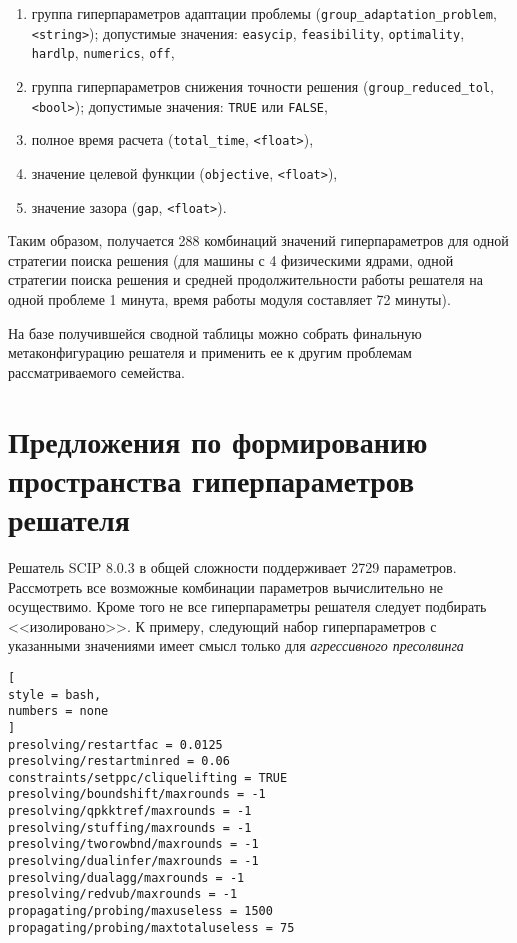 \documentclass[%
	11pt,
	a4paper,
	utf8,
		]{article}
\begin{document}
\begin{enumerate}
	\item группа гиперпараметров адаптации проблемы (\verb|group_adaptation_problem|, \verb|<string>|); допустимые значения: \verb|easycip|, \verb|feasibility|, \verb|optimality|, \verb|hardlp|, \verb|numerics|, \verb|off|,
	
	\item группа гиперпараметров снижения точности решения (\verb|group_reduced_tol|, \verb|<bool>|); допустимые значения: \verb|TRUE| или \verb|FALSE|,
	
	\item полное время расчета (\verb|total_time|, \verb|<float>|),
	
	\item значение целевой функции (\verb|objective|, \verb|<float>|),
	
	\item значение зазора (\verb|gap|, \verb|<float>|).
\end{enumerate}

Таким образом, получается 288 комбинаций значений гиперпараметров для одной стратегии поиска решения (для машины с 4 физическими ядрами, одной стратегии поиска решения и средней продолжительности работы решателя на одной проблеме 1 минута, время работы модуля составляет 72 минуты).

На базе получившейся сводной таблицы можно собрать финальную метаконфигурацию решателя и применить ее к другим проблемам рассматриваемого семейства.

\section{Предложения по формированию пространства гиперпараметров решателя}

Решатель SCIP 8.0.3 в общей сложности поддерживает 2729 параметров. Рассмотреть все возможные комбинации параметров вычислительно не осуществимо. Кроме того не все гиперпараметры решателя следует подбирать <<изолировано>>. К примеру, следующий набор гиперпараметров с указанными значениями имеет смысл только для \emph{агрессивного пресолвинга}
\begin{lstlisting}[
style = bash,
numbers = none
]
presolving/restartfac = 0.0125
presolving/restartminred = 0.06
constraints/setppc/cliquelifting = TRUE
presolving/boundshift/maxrounds = -1
presolving/qpkktref/maxrounds = -1
presolving/stuffing/maxrounds = -1
presolving/tworowbnd/maxrounds = -1
presolving/dualinfer/maxrounds = -1
presolving/dualagg/maxrounds = -1
presolving/redvub/maxrounds = -1
propagating/probing/maxuseless = 1500
propagating/probing/maxtotaluseless = 75
\end{lstlisting}
\end{document}
